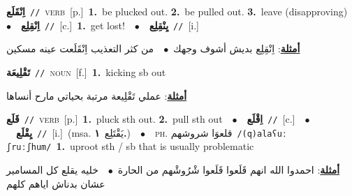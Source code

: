 \documentclass[10pt,a4paper,twoside]{article} %
\begin{document}
\begin{multicols}{2}
{\setlength\topsep{0pt}\textbf{\foreignlanguage{arabic}{اِنْقَلَع}}\ {\color{gray}\texttt{//}\color{black}}\ \textsc{verb}\ [p.]\ \textbf{1.}~be plucked out.  \textbf{2.}~be pulled out.  \textbf{3.}~leave (disapproving)\ \ $\bullet$\ \ \setlength\topsep{0pt}\textbf{\foreignlanguage{arabic}{اِنْقِلِع}}\ {\color{gray}\texttt{//}\color{black}}\ [c.]\ \textbf{1.}~get lost!\ \ $\bullet$\ \ \setlength\topsep{0pt}\textbf{\foreignlanguage{arabic}{يِنْقِلِع}}\ {\color{gray}\texttt{//}\color{black}}\ [i.]\  \begin{flushright}\color{gray}\foreignlanguage{arabic}{\textbf{\underline{\foreignlanguage{arabic}{أمثلة}}}: اِنْقِلِع بديش أشوف وجهك\ $\bullet$\ \  من كثر التعذيب اِنْقَلَعت عينه مسكين}\end{flushright}\color{black}} \vspace{2mm}

{\setlength\topsep{0pt}\textbf{\foreignlanguage{arabic}{تَقْلِيعَة}}\ {\color{gray}\texttt{//}\color{black}}\ \textsc{noun}\ [f.]\ \textbf{1.}~kicking sb out\  \begin{flushright}\color{gray}\foreignlanguage{arabic}{\textbf{\underline{\foreignlanguage{arabic}{أمثلة}}}: عملي تَقْلِيعة مرتبة بحياتي مارح أنساها}\end{flushright}\color{black}} \vspace{2mm}

{\setlength\topsep{0pt}\textbf{\foreignlanguage{arabic}{قَلَع}}\ {\color{gray}\texttt{//}\color{black}}\ \textsc{verb}\ [p.]\ \textbf{1.}~pluck sth out.  \textbf{2.}~pull sth out\ \ $\bullet$\ \ \setlength\topsep{0pt}\textbf{\foreignlanguage{arabic}{اِقْلَع}}\ {\color{gray}\texttt{//}\color{black}}\ [c.]\ \ $\bullet$\ \ \setlength\topsep{0pt}\textbf{\foreignlanguage{arabic}{يِقْلَع}}\ {\color{gray}\texttt{//}\color{black}}\ [i.]\ \color{gray}(msa. \foreignlanguage{arabic}{يَقْتَلِع}~\foreignlanguage{arabic}{\textbf{١.}})\color{black}\ \ $\bullet$\ \ \textsc{ph.} \color{gray} \foreignlanguage{arabic}{قلعوَا شروشهم}\color{black}\ {\color{gray}\texttt{/{\sffamily (q)alaʕuː ʃruːʃhum}/}\color{black}}\ \textbf{1.}~uproot sth / sb that is usually problematic\  \begin{flushright}\color{gray}\foreignlanguage{arabic}{\textbf{\underline{\foreignlanguage{arabic}{أمثلة}}}: احمدوا الله انهم قَلَعوا قَلَعوا شْرُوشْهم من الحارة\ $\bullet$\ \  خليه يقلع كل المسامير عشان بدناش اياهم كلهم}\end{flushright}\color{black}} \vspace{2mm}


\end{multicols}
\end{document}
